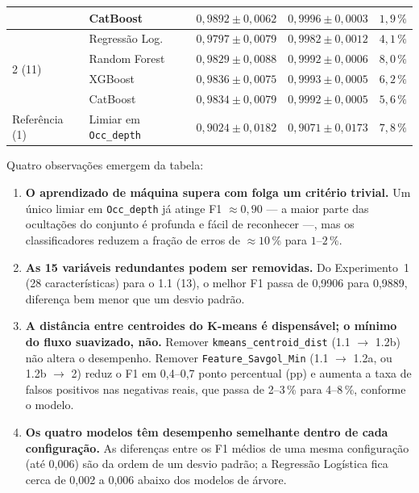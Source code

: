 \begin{table}[htbp]
\begin{tabular}{llccc}
 & CatBoost & $0{,}9892 \pm 0{,}0062$ & $0{,}9996 \pm 0{,}0003$ & $1{,}9\,\%$ \\
\hline
\multirow{4}{*}{2 (11)} & Regressão Log. & $0{,}9797 \pm 0{,}0079$ & $0{,}9982 \pm 0{,}0012$ & $4{,}1\,\%$ \\
 & Random Forest & $0{,}9829 \pm 0{,}0088$ & $0{,}9992 \pm 0{,}0006$ & $8{,}0\,\%$ \\
 & XGBoost & $0{,}9836 \pm 0{,}0075$ & $0{,}9993 \pm 0{,}0005$ & $6{,}2\,\%$ \\
 & CatBoost & $0{,}9834 \pm 0{,}0079$ & $0{,}9992 \pm 0{,}0005$ & $5{,}6\,\%$ \\
\hline
Referência (1) & Limiar em \texttt{Occ\_depth} & $0{,}9024 \pm 0{,}0182$ & $0{,}9071 \pm 0{,}0173$ & $7{,}8\,\%$ \\
\hline
\end{tabular}
\end{table}

Quatro observações emergem da tabela:

\begin{enumerate}
	\item \textbf{O aprendizado de máquina supera com folga um critério trivial.} Um único limiar em \texttt{Occ\_depth} já atinge F1 $\approx 0{,}90$ --- a maior parte das ocultações do conjunto é profunda e fácil de reconhecer ---, mas os classificadores reduzem a fração de erros de $\approx 10\,\%$ para $1$--$2\,\%$.
	\item \textbf{As 15 variáveis redundantes podem ser removidas.} Do Experimento~1 (28 características) para o 1.1 (13), o melhor F1 passa de 0,9906 para 0,9889, diferença bem menor que um desvio padrão.
	\item \textbf{A distância entre centroides do K-means é dispensável; o mínimo do fluxo suavizado, não.} Remover \texttt{kmeans\_centroid\_dist} (1.1 $\to$ 1.2b) não altera o desempenho. Remover \texttt{Feature\_Savgol\_Min} (1.1 $\to$ 1.2a, ou 1.2b $\to$ 2) reduz o F1 em 0,4--0,7 ponto percentual (pp) e aumenta a taxa de falsos positivos nas negativas reais, que passa de 2--3\,\% para 4--8\,\%, conforme o modelo.
	\item \textbf{Os quatro modelos têm desempenho semelhante dentro de cada configuração.} As diferenças entre os F1 médios de uma mesma configuração (até 0,006) são da ordem de um desvio padrão; a Regressão Logística fica cerca de 0,002 a 0,006 abaixo dos modelos de árvore.
\end{enumerate}


